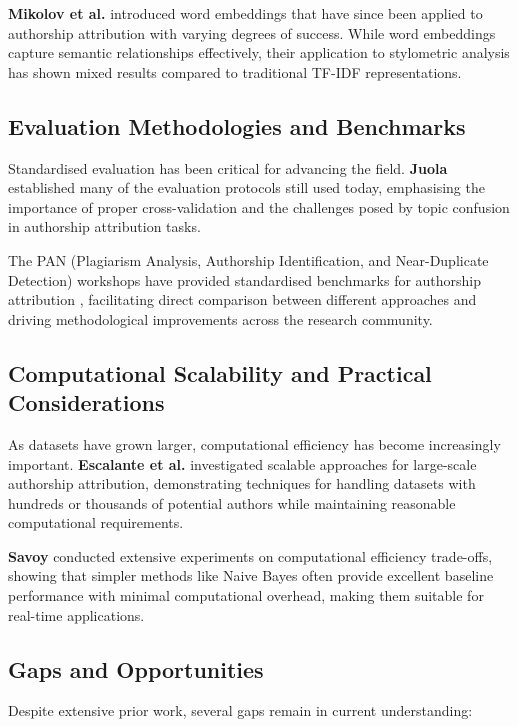 \documentclass[11pt,a4paper]{article}
\begin{document}
\textbf{Mikolov et al.} \cite{mikolov2013word2vec} introduced word embeddings that have since been applied to authorship attribution with varying degrees of success. While word embeddings capture semantic relationships effectively, their application to stylometric analysis has shown mixed results compared to traditional TF-IDF representations.

\subsection{Evaluation Methodologies and Benchmarks}

Standardised evaluation has been critical for advancing the field. \textbf{Juola} \cite{juola2006authorship} established many of the evaluation protocols still used today, emphasising the importance of proper cross-validation and the challenges posed by topic confusion in authorship attribution tasks.

The PAN (Plagiarism Analysis, Authorship Identification, and Near-Duplicate Detection) workshops have provided standardised benchmarks for authorship attribution \cite{stamatatos2018overview}, facilitating direct comparison between different approaches and driving methodological improvements across the research community.

\subsection{Computational Scalability and Practical Considerations}

As datasets have grown larger, computational efficiency has become increasingly important. \textbf{Escalante et al.} \cite{escalante2011local} investigated scalable approaches for large-scale authorship attribution, demonstrating techniques for handling datasets with hundreds or thousands of potential authors while maintaining reasonable computational requirements.

\textbf{Savoy} \cite{savoy2012authorship} conducted extensive experiments on computational efficiency trade-offs, showing that simpler methods like Naive Bayes often provide excellent baseline performance with minimal computational overhead, making them suitable for real-time applications.

\subsection{Gaps and Opportunities}

Despite extensive prior work, several gaps remain in current understanding:
\end{document}
